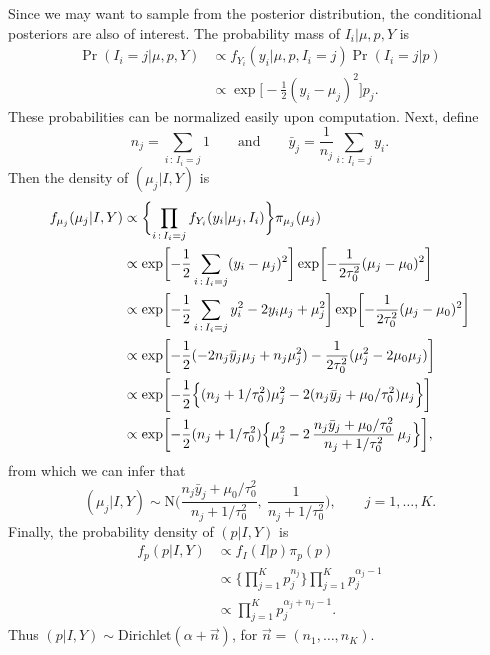 \documentclass[11pt]{article}
\begin{document}
Since we may want to sample from the posterior distribution,
the conditional posteriors are also of interest.
The probability mass of $I_i \vert \mu, p, Y$ is
\begin{align*}
    \Pr(I_i = j \vert \mu, p, Y)
    &\propto
    f_{Y_i}(y_i \vert \mu, p, I_i = j) \Pr(I_i = j \vert p)
    \\ &\propto
    \exp \biggl[ -\frac{1}{2} (y_i - \mu_j)^2 \biggr] p_j.
\end{align*}
These probabilities can be normalized easily upon computation.
Next, define
\[
    n_j = \sum_{i \,:\, I_i = j} 1
    \qquad\text{and}\qquad
    \bar{y}_j = \frac{1}{n_j} \sum_{i \,:\, I_i = j} y_i.
\]
Then the density of $(\mu_j \vert I, Y)$ is
\begin{align*}
    f_{\mu_j}(\mu_j \vert I, Y)
    &\propto
    \biggl\{ 
        \prod_{i \,:\, I_i = j} f_{Y_i}(y_i \vert \mu_j, I_i)
    \biggr\}
    \pi_{\mu_j}(\mu_j)
    \\ &\propto
    \exp\biggl[ 
        -\frac{1}{2} \sum_{i \,:\, I_i = j} (y_i - \mu_j)^2 
    \biggr]
    \exp\biggl[
        -\frac{1}{2\tau_0^2} (\mu_j - \mu_0)^2
    \biggr]
    \\ &\propto
    \exp\biggl[ 
        -\frac{1}{2} \sum_{i \,:\, I_i = j} y_i^2 - 2y_i\mu_j + \mu_j^2 
    \biggr]
    \exp\biggl[
        -\frac{1}{2\tau_0^2} (\mu_j - \mu_0)^2
    \biggr]
    \\ &\propto
    \exp\biggl[ 
        -\frac{1}{2}(-2n_j \bar{y}_j\mu_j + n_j \mu_j^2)
        -\frac{1}{2\tau_0^2} (\mu_j^2 - 2 \mu_0\mu_j)
    \biggr]
    \\ &\propto
    \exp\biggl[
        -\frac{1}{2}
        \Bigl\{
        (n_j + 1 / \tau_0^2) \mu_j^2 
        - 2(n_j\bar{y}_j + \mu_0 / \tau_0^2)\mu_j
        \Bigr\}
    \biggr]
    \\ &\propto
    \exp\biggl[
        -\frac{1}{2} (n_j + 1 / \tau_0^2)
        \Bigl\{
        \mu_j^2 
        -2\,\frac{n_j\bar{y}_j + \mu_0 / \tau_0^2}{n_j + 1 / \tau_0^2} \,\mu_j
        \Bigr\}
    \biggr],
\end{align*}
from which we can infer that
\[
    (\mu_j \vert I, Y)
    \sim
    \textrm{N} \biggl(
        \frac{n_j\bar{y}_j + \mu_0 / \tau_0^2}{n_j + 1 / \tau_0^2}, \
        \frac{1}{n_j + 1 / \tau_0^2}
    \biggr),
    \qquad
    j = 1, \ldots, K.
\]
Finally, the probability density of $(p \vert I, Y)$ is
\begin{align*}
    f_p(p \vert I, Y)
    &\propto
    f_{I}(I \vert p) \pi_p(p)
    \\ &\propto
    \biggl\{ \prod_{j=1}^K p_j^{n_j} \biggr\}
    \prod_{j=1}^K p_j^{\alpha_j - 1}
    \\ &\propto
    \prod_{j=1}^K p_j^{\alpha_j + n_j - 1}.
\end{align*}
Thus $(p \vert I, Y) \sim \textrm{Dirichlet}(\alpha + \vec{n})$,
for $\vec{n} = (n_1, \ldots, n_K)$.
\end{document}
